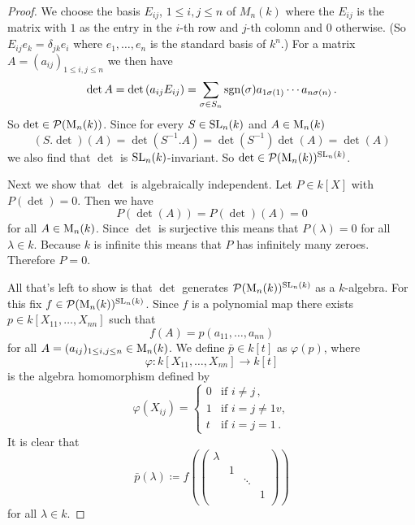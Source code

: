 \begin{proof}
  We choose the basis $E_{ij}$, $1 \leq i,j \leq n$ of $M_n(k)$ where the $E_{ij}$ is the matrix with $1$ as the entry in the $i$-th row and $j$-th colomn and $0$ otherwise.
  (So $E_{ij} e_k = \delta_{jk}e_i$ where $e_1, \dotsc, e_n$ is the standard basis of $k^n$.)
  For a matrix $A = (a_{ij})_{1 \leq i,j \leq n}$ we then have
  \[
      \det A
    = \det\left( a_{ij} E_{ij} \right)
    = \sum_{\sigma \in S_n} \operatorname{sgn}(\sigma) a_{1 \sigma(1)} \dotsm a_{n \sigma(n)} \,.
  \]
  So $\det \in \mathcal{P}(\operatorname{M}_n(k))$.
  Since for every $S \in \operatorname{SL}_n(k)$ and $A \in \operatorname{M}_n(k)$
  \[
      (S.\det)(A)
    = \det\left(S^{-1}.A\right)
    = \det\left( S^{-1} \right) \det(A)
    = \det(A)
  \]
  we also find that $\det$ is $\operatorname{SL}_n(k)$-invariant.
  So $\det \in \mathcal{P}(\operatorname{M}_n(k))^{\operatorname{SL}_n(k)}$.
  
  Next we show that $\det$ is algebraically independent.
  Let $P \in k[X]$ with $P(\det) = 0$. Then we have
  \[
      P(\det(A))
    = P(\det)(A)
    = 0
  \]
  for all $A \in \operatorname{M}_n(k)$.
  Since $\det$ is surjective this means that $P(\lambda) = 0$ for all $\lambda \in k$.
  Because $k$ is infinite this means that $P$ has infinitely many zeroes.
  Therefore $P = 0$.
  
  All that’s left to show is that $\det$ generates $\mathcal{P}(\operatorname{M}_n(k))^{\operatorname{SL}_n(k)}$ as a $k$-algebra.
  For this fix $f \in \mathcal{P}(\operatorname{M}_n(k))^{\operatorname{SL}_n(k)}$.
  Since $f$ is a polynomial map there exists $p \in k[X_{11}, \dotsc, X_{nn}]$ such that
  \[
      f(A)
    = p(a_{11}, \dotsc, a_{nn})
  \]
  for all $A = (a_{ij})_{1 \leq i,j \leq n} \in \operatorname{M}_n(k)$.
  We define $\bar{p} \in k[t]$ as $\varphi(p)$, where
  \[
            \varphi
    \colon  k[X_{11}, \dotsc, X_{nn}]
    \to     k[t]
  \] 
  is the algebra homomorphism defined by 
  \[
      \varphi(X_{ij})
    = \begin{cases}
        0 & \text{if } i \neq j \,,     \\
        1 & \text{if } i = j \neq 1 v,  \\
        t & \text{if } i = j = 1 \,.
      \end{cases}
  \]
  It is clear that
  \[
              \bar{p}(\lambda)
    \coloneqq f\left(
                \begin{pmatrix}
                  \lambda &   &        &   \\
                          & 1 &        &   \\
                          &   & \ddots &   \\
                          &   &        & 1 \\
                \end{pmatrix}
              \right)
  \]
  for all $\lambda \in k$.
  

\end{proof}
